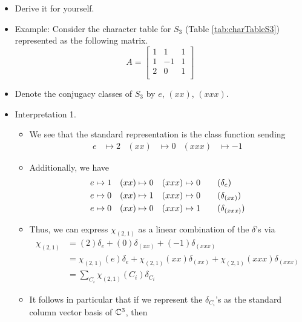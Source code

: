 \documentclass[../notes.tex]{subfiles}
\begin{document}
\begin{itemize}
    \begin{itemize}
        \item Derive it for yourself.
        \item Example: Consider the character table for $S_3$ (Table \ref{tab:charTableS3}) represented as the following matrix.
        \begin{equation*}
            A =
            \begin{bmatrix}
                1 & 1 & 1\\
                1 & -1 & 1\\
                2 & 0 & 1\\
            \end{bmatrix}
        \end{equation*}
        \item Denote the conjugacy classes of $S_3$ by $e$, $(xx)$, $(xxx)$.
        \item Interpretation 1.
        \begin{itemize}
            \item We see that the standard representation is the class function sending
            \begin{align*}
                e &\mapsto 2&
                (xx) &\mapsto 0&
                (xxx) &\mapsto -1
            \end{align*}
            \item Additionally, we have
            \begin{align*}
                e &\mapsto 1& (xx) &\mapsto 0& (xxx) &\mapsto 0\tag{$\delta_e$}\\
                e &\mapsto 0& (xx) &\mapsto 1& (xxx) &\mapsto 0\tag{$\delta_{(xx)}$}\\
                e &\mapsto 0& (xx) &\mapsto 0& (xxx) &\mapsto 1\tag{$\delta_{(xxx)}$}
            \end{align*}
            \item Thus, we can express $\chi_{(2,1)}$ as a linear combination of the $\delta$'s via
            \begin{align*}
                \chi_{(2,1)} &= (2)\delta_e+(0)\delta_{(xx)}+(-1)\delta_{(xxx)}\\
                &= \chi_{(2,1)}(e)\delta_e+\chi_{(2,1)}(xx)\delta_{(xx)}+\chi_{(2,1)}(xxx)\delta_{(xxx)}\\
                &= \sum_{C_i}\chi_{(2,1)}(C_i)\delta_{C_i}
            \end{align*}
            \item It follows in particular that if we represent the $\delta_{C_i}$'s as the standard column vector basis of $\mathbb{C}^3$, then

\end{itemize}
\end{itemize}
\end{itemize}
\end{document}
